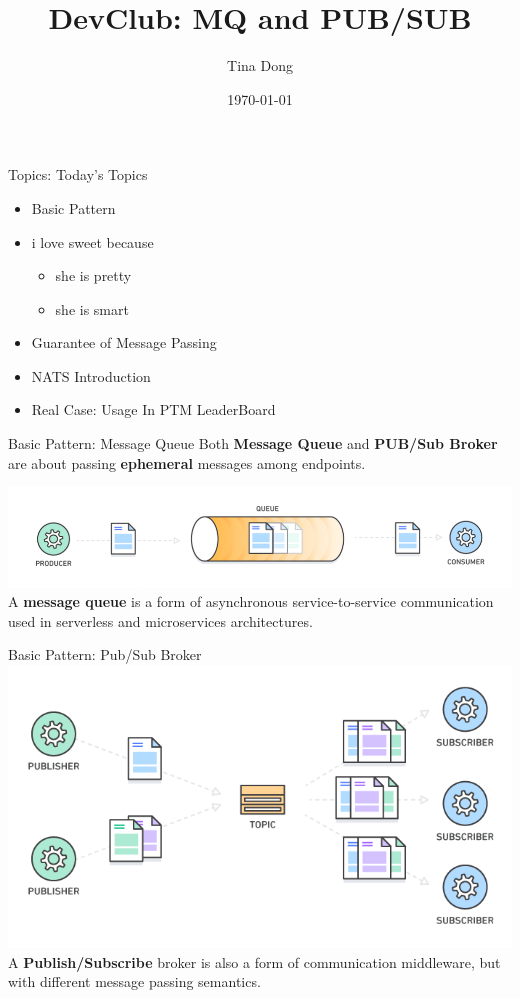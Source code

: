 \documentclass{beamer}
\author{Tina Dong}
\title{DevClub: MQ and PUB/SUB }
\date{\today}
\begin{document}
\maketitle

\begin{frame}{Topics: Today's Topics}
    \begin{itemize}
        \item Basic Pattern
        \item i love sweet because 
        \begin{itemize}
            \item she is pretty
            \item she is smart
        \end{itemize}
        \item Guarantee of Message Passing
        \item NATS Introduction
        \item Real Case: Usage In PTM LeaderBoard
    \end{itemize}
\end{frame}

\begin{frame}{Basic Pattern: Message Queue}
    Both \textbf{Message Queue} and \textbf{PUB/Sub Broker} are about passing 
    \textbf{ephemeral} messages among endpoints.

    \includegraphics[width=\textwidth]{assets/mq.png}
    A \textbf{message queue} is a form of asynchronous service-to-service 
    communication used in serverless and microservices architectures.
\end{frame}

\begin{frame}{Basic Pattern: Pub/Sub Broker}
    \includegraphics[width=\textwidth]{assets/pubsub.png}
    A \textbf{Publish/Subscribe} broker is also a form of communication middleware, but with different 
    message passing semantics.
\end{frame}
\end{document}
